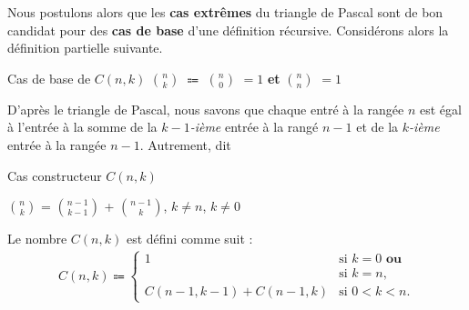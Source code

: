 \documentclass[16pt]{report}
\begin{document}
\begin{multicols*}{2}
    Nous postulons alors que les \textbf{cas extrêmes} du triangle de Pascal sont de bon candidat pour 
    des \textbf{cas de base} d'une définition récursive. Considérons alors la définition partielle suivante. 
    \begin{Definitionx}{Cas de base de $C(n, k)$}{}
       $n \choose k$ $\Coloneqq$ $n \choose 0$ $= 1$ \textbf{et} $n \choose n$ $= 1$      
    \end{Definitionx}

    D'après le triangle de Pascal, nous savons que chaque entré à la rangée $n$ est égal à 
    l'entrée à la somme de la $k-1$\textit{-ième} entrée à la rangé $n-1$ et de la \textit{$k$-ième} entrée 
    à la rangée $n-1$.
    Autrement, dit 
    
    \begin{Definitionx}{Cas constructeur $C(n, k)$}{}
        \begin{center}
        $n \choose k$ =  $n-1 \choose k-1$ + $n -1 \choose k$, $k \neq n$, $k \neq 0$ 
        \end{center}        
    \end{Definitionx}

\begin{Definition}{}{}
    Le nombre \( C(n, k) \) est défini comme suit :
    \begin{align*}
            C(n, k) \Coloneqq
            \begin{cases}
                1 & \text{si } k = 0 \textbf{ ou } \\ 
                  & \text{si } k = n, \\
                C(n-1, k-1) + C(n-1, k) & \text{si } 0 < k < n.
            \end{cases}             
    \end{align*}
    
\end{Definition}

\end{multicols*}  
\end{document}
